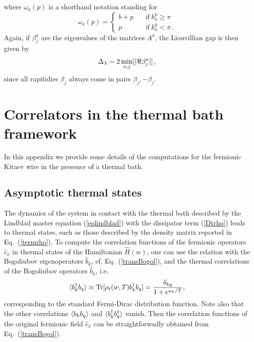 where $\omega_a(p)$ is a shorthand notation standing for
\begin{equation}
    \omega_a(p)=
    \begin{cases}
    b + p \quad &\text{if} \ k_a^p\geq\pi\\
    p \quad &\text{if} \ k_a^p<\pi\,.
    \end{cases}
\label{eq_third_quantization_momentum_omega_a_p}
\end{equation}
Again, if $\beta^a_j$ are the eigenvalues of the matrices $A^a$, the Liouvillian gap is then given by
\begin{equation}
    \Delta_\lambda=2\min_{a,j}[\lvert\Re \beta^a_j\rvert]\,,
    \label{eq_third_quantization_def_beta_j_a}
\end{equation}
since all rapitidies $\beta_j$ always come in pairs $\beta_j,-\beta_j$.





\chapter{Correlators in the thermal bath framework}

\label{detcomp}

In this appendix we provide some details of the computations for the
fermionic Kitaev wire in the presence of a thermal bath.


\section{Asymptotic thermal states}
\label{asyther}

The dynamics of the system in contact with the thermal bath described
by the Lindblad master equation (\ref{eqlindblad}) with the dissipator
term (\ref{Dtrho}) leads to thermal states, such as those described by
  the density matrix reported in Eq.~(\ref{termrho}).  To compute the
  correlation functions of the fermionic operators $\hat{c}_x$ in
  thermal states of the Hamiltonian $\hat{H}(w)$, one can use the
  relation with the Bogoliubov eigenoperators $\hat{b}_k$,
  cf. Eq.~(\ref{transBogol}), and the thermal correlations of the
  Bogoliubov operators $\hat{b}_k$, i.e.
 \begin{eqnarray}
      \braket{b^\dagger_k b_q} \equiv {\rm Tr}[\rho_t(w,T) b_k^\dagger
        b_q] = \frac{\delta_{kq}}{1 + e^{\omega_k/T}},
\label{bcoth}
    \end{eqnarray}
    corresponding to the standard Fermi-Dirac distribution function.
    Note also that the other correlations $\braket{b_k b_q}$ and
    $\braket{b_k^\dagger b_q^\dagger}$ vanish.  Then the correlation
    functions of the original fermionic field $\hat{c}_x$ can be
    straightforwadly obtained from Eq.~(\ref{transBogol}).






